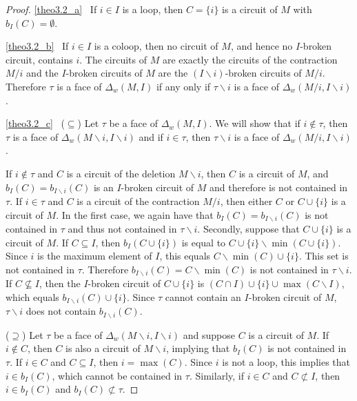 \documentclass[ALCO,ThmDefs,Unicode,epreuves]{cedram}
\begin{document}
\begin{proof}%

\ref{theo3.2_a}~%
If $i\in I$ is a loop, then $C = \{i\}$ is a circuit of $M$ with $b_I(C) = \emptyset$. 

\ref{theo3.2_b}~%
If $i\in I$ is a coloop, then no circuit of $M$, and hence no $I$-broken circuit, contains $i$. 
The circuits of $M$ are exactly the circuits of the contraction $M/i$ and the $I$-broken circuits of $M$ 
are the $(I\backslash i)$-broken circuits of $M/i$. 
Therefore $\tau$ is a face of $\Delta_w(M,I)$ if any only if $\tau\backslash i$ is a face of $\Delta_w(M/i,I\backslash i)$.

\ref{theo3.2_c}~%
($\subseteq$) Let $\tau$ be a face of $\Delta_w(M,I)$. We will show that if $i\not\in \tau$, then $\tau$ is a 
face of $\Delta_w(M\backslash i ,I\backslash i)$ and if $i \in \tau$, then $\tau\backslash i$ is a face of $\Delta_w(M/i ,I\backslash i)$.

If $i\not\in \tau$ and $C$ is a circuit of the deletion $M\backslash i$, then $C$
is a circuit of $M$, and $b_I(C)=b_{I\backslash i}(C)$ is an $I$-broken circuit of $M$ and therefore is not contained in $\tau$. 
If $i \in \tau$ and $C$ is a circuit of the contraction $M/i$, then either $C$ or $C\cup \{i\}$ is a circuit of $M$. 
In the first case, we again have that $b_I(C)=b_{I\backslash i}(C)$ is not contained in $\tau$ and thus not contained in $\tau\backslash i$. 
Secondly, suppose that $C\cup\{i\}$ is a circuit of $M$. 
If $C\subseteq I$, then $b_I(C\cup\{i\})$ is equal to $C\cup\{i\}\backslash \min(C\cup\{i\})$. Since $i$ is the maximum element of $I$, 
this equals $C\backslash \min(C) \cup\{i\}$. This set is not contained in $\tau$. Therefore $b_{I\backslash i}(C) = C\backslash \min(C)$ 
is not contained in $\tau \backslash i$. 
If $C\not\subseteq I$, then the $I$-broken circuit of $C\cup \{i\}$ is $(C\cap I) \cup \{ i\} \cup \max(C\backslash I)$, 
which equals $b_{I\backslash i}(C) \cup \{i\}$. Since $\tau$ cannot contain an $I$-broken circuit of $M$, $\tau\backslash i$ does not contain $b_{I\backslash i}(C)$. 

($\supseteq$) Let $\tau$ be a face of $\Delta_w(M\backslash i ,I\backslash i)$ and suppose $C$ is a circuit of $M$. 
If $i\not\in C$, then $C$ is also a circuit of $M\backslash i $, implying that $b_I(C)$ is not contained in $\tau$. 
If $i\in C$ and $C\subseteq I$, then $i = \max(C)$. Since $i$ is not a loop, this implies that $i\in b_I(C)$, which 
 cannot be contained in $\tau$. Similarly, if $i\in C$ and $C\not\subset I$, then $i\in b_I(C)$ and $b_I(C)\not\subset \tau$. 


\end{proof}
\end{document}
